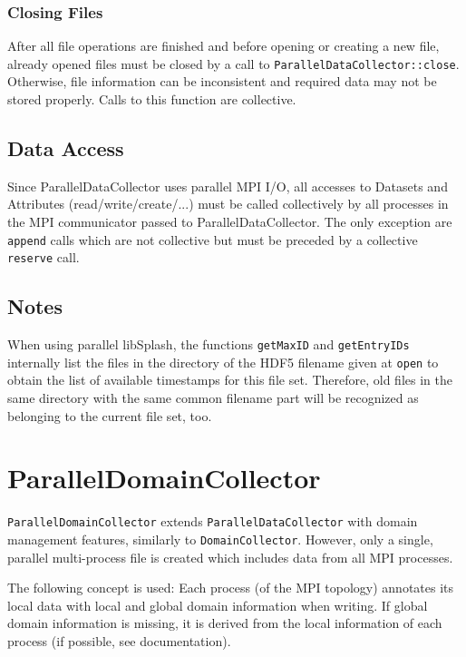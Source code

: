 \documentclass[a4paper,10pt,BCOR12mm]{report}
\newcommand{\code}[1]{\small \texttt{#1}}
\begin{document}
\subsection{Closing Files}

After all file operations are finished and before opening or creating a new file,
already opened files must be closed by a call to \code{ParallelDataCollector::close}.
Otherwise, file information can be inconsistent and required data may not
be stored properly.
Calls to this function are collective.


\section{Data Access}

Since ParallelDataCollector uses parallel MPI I/O, all accesses to Datasets and Attributes (read/write/create/...)
must be called collectively by all processes in the MPI communicator passed to ParallelDataCollector.
The only exception are \code{append} calls which are not collective but must be preceded by a collective \code{reserve} call.


\section{Notes}

When using parallel libSplash, the functions \code{getMaxID} and \code{getEntryIDs}
internally list the files in the directory of the HDF5 filename given at \code{open}
to obtain the list of available timestamps for this file set.
Therefore, old files in the same directory with the same common filename part will be recognized as belonging
to the current file set, too.



\chapter{ParallelDomainCollector}

\code{ParallelDomainCollector} extends \code{ParallelDataCollector} with domain management features,
similarly to \code{DomainCollector}.
However, only a single, parallel multi-process file is created which includes data from all MPI processes.

The following concept is used: Each process (of the MPI topology)
annotates its local data with local and global domain information when writing.
If global domain information is missing, it is derived from the local information of each process
(if possible, see documentation).
\end{document}

